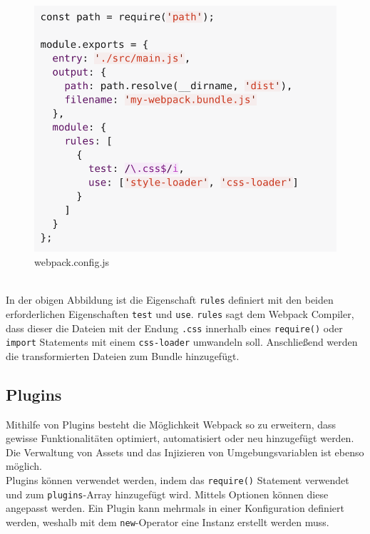 \begin{figure}[H]
	\begin{center}
		\includegraphics[scale=.7]{images/webpack-loaders.png}
	\end{center}
		\caption{webpack.config.js}
\end{figure}

\mbox{}\\
In der obigen Abbildung ist die Eigenschaft \texttt{rules} definiert mit den beiden erforderlichen Eigenschaften \texttt{test} und \texttt{use}. \texttt{rules} sagt dem Webpack Compiler, dass dieser die Dateien mit der Endung \texttt{.css} innerhalb eines \texttt{require()} oder \texttt{import} Statements mit einem \texttt{css-loader} umwandeln soll. Anschließend werden die transformierten Dateien zum Bundle hinzugefügt.

\subsection{Plugins}
Mithilfe von Plugins besteht die Möglichkeit Webpack so zu erweitern, dass gewisse Funktionalitäten optimiert, automatisiert oder neu hinzugefügt werden. Die Verwaltung von Assets und das Injizieren von Umgebungsvariablen ist ebenso möglich. 
\mbox{}\\
Plugins können verwendet werden, indem das \texttt{require()} Statement verwendet und zum \texttt{plugins}-Array hinzugefügt wird. Mittels Optionen können diese angepasst werden. Ein Plugin kann mehrmals in einer Konfiguration definiert werden, weshalb mit dem \texttt{new}-Operator eine Instanz erstellt werden muss.

